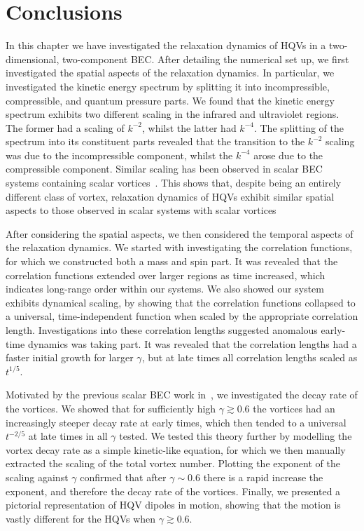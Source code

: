 \section{Conclusions}
In this chapter we have investigated the relaxation dynamics of HQVs in a
two-dimensional, two-component BEC\@.
After detailing the numerical set up, we first investigated the spatial aspects
of the relaxation dynamics.
In particular, we investigated the kinetic energy spectrum by splitting it
into incompressible, compressible, and quantum pressure parts.
We found that the kinetic energy spectrum exhibits two different scaling in the
infrared and ultraviolet regions.
The former had a scaling of \(k^{-2}\), whilst the latter had \(k^{-4}\).
The splitting of the spectrum into its constituent parts revealed that the
transition to the \(k^{-2}\) scaling was due to the incompressible component,
whilst the \(k^{-4}\) arose due to the compressible component.
Similar scaling has been observed in scalar BEC systems containing scalar
vortices~\cite{Nowak2012}.
This shows that, despite being an entirely different class of vortex, relaxation
dynamics of HQVs exhibit similar spatial aspects to those observed in scalar
systems with scalar vortices

After considering the spatial aspects, we then considered the temporal aspects
of the relaxation dynamics.
We started with investigating the correlation functions, for which we
constructed both a mass and spin part.
It was revealed that the correlation functions extended over larger regions as
time increased, which indicates long-range order within our systems.
We also showed our system exhibits dynamical scaling, by showing that the
correlation functions collapsed to a universal, time-independent function when
scaled by the appropriate correlation length.
Investigations into these correlation lengths suggested anomalous early-time
dynamics was taking part.
It was revealed that the correlation lengths had a faster initial growth for
larger \(\gamma \), but at late times all correlation lengths scaled as
\(t^{1/5}\).

Motivated by the previous scalar BEC work in~\cite{Karl2017}, we investigated
the decay rate of the vortices.
We showed that for sufficiently high \(\gamma \gtrsim 0.6\) the vortices had an
increasingly steeper decay rate at early times, which then tended to a universal
\(t^{-2/5}\) at late times in all \(\gamma \) tested.
We tested this theory further by modelling the vortex decay rate as a simple
kinetic-like equation, for which we then manually extracted the scaling of
the total vortex number.
Plotting the exponent of the scaling against \(\gamma \) confirmed that after
\(\gamma \sim 0.6\) there is a rapid increase the exponent, and therefore the
decay rate of the vortices.
Finally, we presented a pictorial representation of HQV dipoles in motion,
showing that the motion is vastly different for the HQVs when
\(\gamma \gtrsim 0.6\).